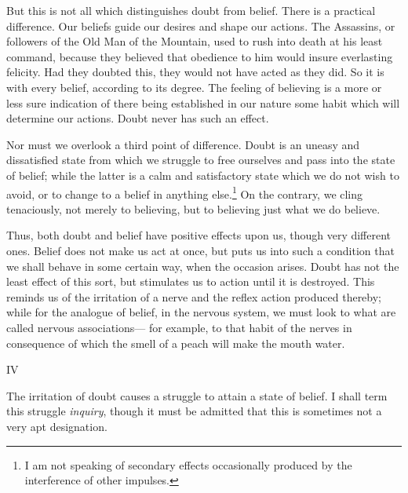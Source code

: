 \documentclass[]{article}
\newcounter{authornote}[page]
\newcommand{\authornote}[1]{\renewcommand{\thefootnote}{\fnsymbol{footnote}}\stepcounter{authornote}\footnote[\value{authornote}]{#1}\renewcommand{\thefootnote}{\arabic{footnote}}}
\newcommand*{\itemsection}[1]{\bigskip\centerline{#1}\nopagebreak}
\begin{document}
But this is not all which distinguishes doubt from belief. There is a practical difference. Our beliefs guide our desires and shape our actions. The Assassins, or followers of the Old Man of the Mountain, used to rush into death at his least command, because they believed that obedience to him would insure everlasting felicity. Had they doubted this, they would not have acted as they did. So it is with every belief, according to its degree. The feeling of believing is a more or less sure indication of there being established in our nature some habit which will determine our actions. Doubt never has such an effect.

Nor must we overlook a third point of difference. Doubt is an uneasy and dissatisfied state from which we struggle to free ourselves and pass into the state of belief; while the latter is a calm and satisfactory state which we do not wish to avoid, or to change to a belief in anything else.\authornote{ I am not speaking of secondary effects occasionally produced by the interference of other impulses.} On the contrary, we cling tenaciously, not merely to believing, but to believing just what we do believe.


Thus, both doubt and belief have positive effects upon us, though very different ones. Belief does not make us act at once, but puts us into such a condition that we shall behave in some certain way, when the occasion arises. Doubt has not the least effect of this sort, but stimulates us to action until it is destroyed. This reminds us of the irritation of a nerve and the reflex action produced thereby; while for the analogue of belief, in the nervous system, we must look to what are called nervous associations--- for example, to that habit of the nerves in consequence of which the smell of a peach will make the mouth water.

\itemsection{IV}

The irritation of doubt causes a struggle to attain a state of belief. I shall term this struggle \emph{inquiry}, though it must be admitted that this is sometimes not a very apt designation.
\end{document}
